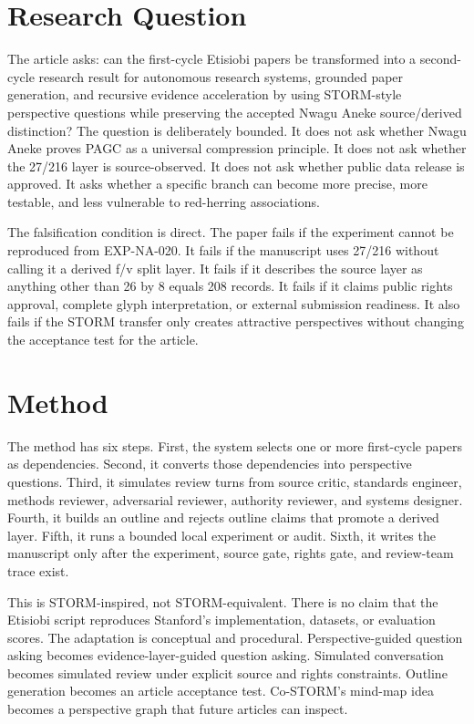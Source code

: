 \documentclass[sigconf,nonacm]{acmart}
\begin{document}
\section{Research Question}
The article asks: can the first-cycle Etisiobi papers be transformed into a
second-cycle research result for autonomous research systems, grounded paper generation, and recursive evidence acceleration by using STORM-style perspective
questions while preserving the accepted Nwagu Aneke source/derived distinction?
The question is deliberately bounded. It does not ask whether Nwagu Aneke proves
PAGC as a universal compression principle. It does not ask whether the 27/216
layer is source-observed. It does not ask whether public data release is
approved. It asks whether a specific branch can become more precise, more
testable, and less vulnerable to red-herring associations.

The falsification condition is direct. The paper fails if the experiment cannot
be reproduced from EXP-NA-020. It fails if the manuscript uses 27/216 without
calling it a derived f/v split layer. It fails if it describes the source layer
as anything other than 26 by 8 equals 208 records. It fails if it claims public
rights approval, complete glyph interpretation, or external submission readiness.
It also fails if the STORM transfer only creates attractive perspectives without
changing the acceptance test for the article.

\section{Method}
The method has six steps. First, the system selects one or more first-cycle
papers as dependencies. Second, it converts those dependencies into perspective
questions. Third, it simulates review turns from source critic, standards
engineer, methods reviewer, adversarial reviewer, authority reviewer, and
systems designer. Fourth, it builds an outline and rejects outline claims that
promote a derived layer. Fifth, it runs a bounded local experiment or audit.
Sixth, it writes the manuscript only after the experiment, source gate, rights
gate, and review-team trace exist.

This is STORM-inspired, not STORM-equivalent. There is no claim that the
Etisiobi script reproduces Stanford's implementation, datasets, or evaluation
scores. The adaptation is conceptual and procedural. Perspective-guided question
asking becomes evidence-layer-guided question asking. Simulated conversation
becomes simulated review under explicit source and rights constraints. Outline
generation becomes an article acceptance test. Co-STORM's mind-map idea becomes
a perspective graph that future articles can inspect.
\end{document}
